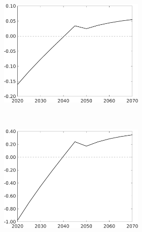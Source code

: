 \begin{figure}[h!!!]
	\centering
	\caption{Decomposition effect of combined policy}\label{fig:efftaul}
	\begin{subfigure}{1\textwidth}
		\caption{\textbf{Deviation of combined policy from carbon-tax-only policy in percent}}
		\vspace{3mm}
	\begin{subfigure}{0.4\textwidth}
		\includegraphics[width=1\textwidth]{../../codding_model/own_basedOnFried/optimalPol_010922_revision/figures/all_13Sept22_Tplus30/Tauf_OPT_T_NoTaus_COMPtaulPer_regime4_spillover0_knspil0_noskill0_sep0_xgrowth0_PV1_etaa0.79.png}
	\end{subfigure}
\begin{minipage}[]{0.1\textwidth}
\
\end{minipage}
\begin{subfigure}{0.4\textwidth}
	\includegraphics[width=1\textwidth]{../../codding_model/own_basedOnFried/optimalPol_010922_revision/figures/all_13Sept22_Tplus30/sgsff_OPT_T_NoTaus_COMPtaulPer_regime4_spillover0_knspil0_noskill0_sep0_xgrowth0_PV1_etaa0.79.png}
\end{subfigure}
\end{subfigure}


\end{figure}
